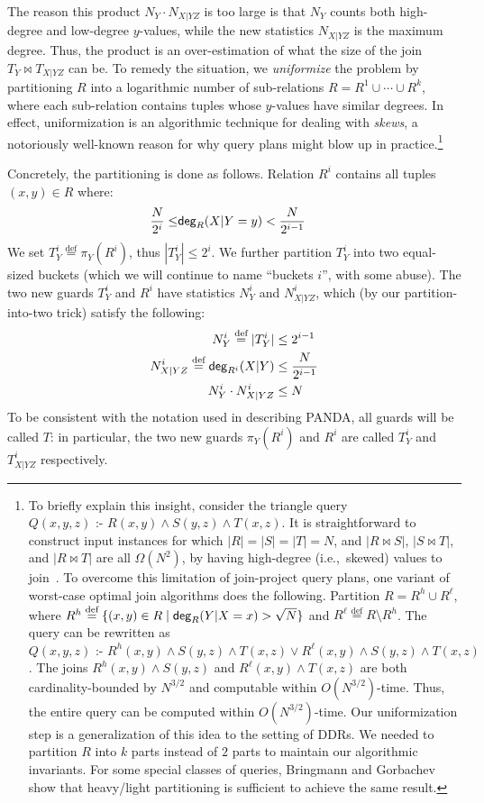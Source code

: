 \documentclass[10pt,a4paper]{article}
\newcommand{\set}[1]{\{#1\}}                    %
\newcommand{\degree}{\text{\sf deg}}
\newcommand{\defeq}{\stackrel{\text{def}}{=}}
\newcommand{\cd}{\text{ :- }}
\newcommand{\panda}{\textsf{PANDA}\xspace}
\begin{document}
The reason this product $N_Y\cdot N_{X|YZ}$ is too large is that $N_Y$ counts both
high-degree and low-degree $y$-values, while the new statistics $N_{X|YZ}$ is the maximum
degree. Thus, the product is an over-estimation of what the size of the join $T_Y \Join
T_{X|YZ}$ can be. To remedy the situation, we {\em uniformize} the problem by partitioning
$R$ into a logarithmic number of sub-relations $R = R^1 \cup \cdots \cup R^k$, where each
sub-relation contains tuples whose $y$-values have similar degrees. In effect,
uniformization is an algorithmic technique for dealing with {\em skews}, a notoriously
well-known reason for why query plans might blow up in practice.\footnote{To
briefly explain  this insight, consider the triangle query $Q(x,y,z) \cd R(x,y) \wedge
S(y,z) \wedge T(x,z)$. It is straightforward to construct input instances for which $|R|=|S|=|T|=N$,
and $|R \Join S|$, $|S \Join T|$, and $|R \Join T|$ are all $\Omega(N^2)$, by having high-degree
(i.e.,~skewed) values to join~\cite{DBLP:journals/jacm/NgoPRR18}.
To overcome this limitation of join-project query plans, one variant of worst-case optimal
join algorithms does the following. Partition $R = R^h \cup R^\ell$, where
$R^h \defeq \set{(x,y) \in R \mid \degree_R(Y|X=x) > \sqrt N}$ and
$R^\ell \defeq R \setminus R^h$.\newline
%
The query can be rewritten as $Q(x,y,z) \cd R^h(x,y) \wedge S(y,z) \wedge T(x,z) \vee
R^\ell(x,y) \wedge S(y,z) \wedge T(x,z)$. The joins $R^h(x,y) \wedge S(y,z)$ and $R^\ell(x,
y) \wedge T(x, z)$ are both cardinality-bounded by $N^{3/2}$ and computable within
$O(N^{3/2})$-time. Thus, the entire query can be computed within $O(N^{3/2})$-time.\newline
%
Our uniformization step is a generalization of this idea to the setting of DDRs. We needed
to partition $R$ into $k$ parts instead of $2$ parts to maintain our algorithmic invariants.
For some special classes of queries, Bringmann and
Gorbachev~\cite{bringmann2024} show that
heavy/light partitioning is sufficient to achieve the same result.}


Concretely, the partitioning is done as follows.
Relation $R^i$ contains all tuples $(x,y)\in R$ where:
%
\begin{align*}
  \frac{N}{2^i}\leq & \degree_{R}(X|Y=y) < \frac{N}{2^{i-1}}
\end{align*}
%
We set $T^i_Y \defeq \pi_Y(R^i)$, thus $|T_Y^i| \leq 2^i$.  We further
partition $T_Y^i$ into two equal-sized buckets (which we will continue
to name ``buckets $i$'', with some abuse).  The two new guards $T_Y^i$ and $R^i$ have
statistics $N^i_Y$ and $N^i_{X|YZ}$, which (by our partition-into-two
trick) satisfy the following:
\begin{align*}
    N^i_Y \defeq |T_Y^i| & \leq 2^{i-1} \\
    N^i_{X|YZ} \defeq\degree_{R^i}(X|Y) &\leq \frac{N}{2^{i-1}} \\
   N^i_Y \cdot N^i_{X|YZ} & \leq N
\end{align*}
To be consistent with the notation used in describing \panda,
all guards will be called $T$: in particular, the two new guards  $\pi_Y(R^i)$ and $R^i$ are called $T^i_Y$ and
$T^i_{X|YZ}$ respectively.
\end{document}

